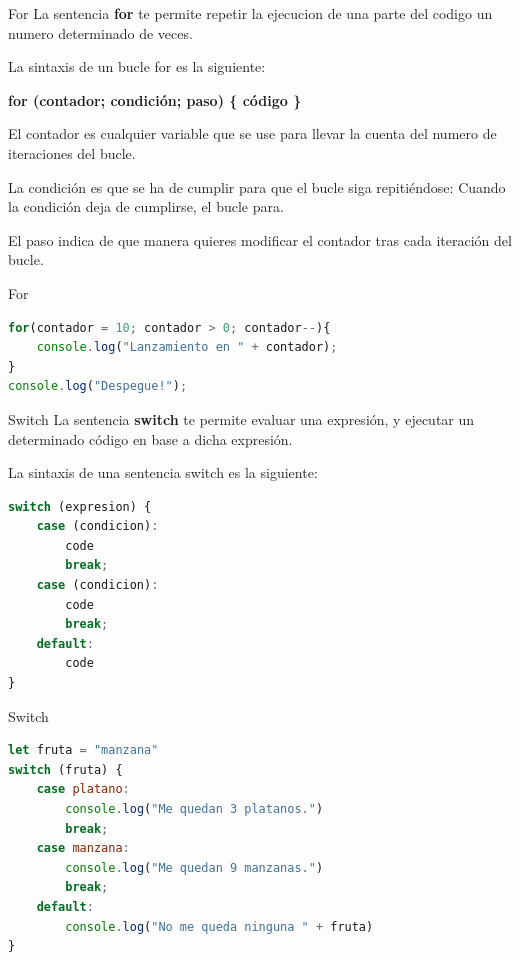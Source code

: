 \documentclass{beamer}
\begin{document}
\begin{frame}{For}
La sentencia \textbf{for} te permite repetir la ejecucion de una parte del codigo un numero determinado de veces.

La sintaxis de un bucle for es la siguiente:

\textbf{for (contador; condición; paso) \{ código \} }

El contador es cualquier variable que se use para llevar la cuenta del numero de iteraciones del bucle.

La condición es que se ha de cumplir para que el bucle siga repitiéndose: Cuando la condición deja de cumplirse, el bucle para.

El paso indica de que manera quieres modificar el contador tras cada iteración del bucle.
\end{frame}

\begin{frame}[fragile]{For}
\begin{lstlisting}[language=JavaScript]
for(contador = 10; contador > 0; contador--){
    console.log("Lanzamiento en " + contador);
}
console.log("Despegue!");
\end{lstlisting}
\end{frame}

\begin{frame}[fragile]{Switch}
La sentencia \textbf{switch} te permite evaluar una expresión, y ejecutar un determinado código en base a dicha expresión.

La sintaxis de una sentencia switch es la siguiente:

\begin{lstlisting}[language=JavaScript]
switch (expresion) {
    case (condicion): 
        code
        break;
    case (condicion):
        code
        break;
    default:
        code
}\end{lstlisting}
\end{frame}

\begin{frame}[fragile]{Switch}
\begin{lstlisting}[language=JavaScript]
let fruta = "manzana"
switch (fruta) {
    case platano: 
        console.log("Me quedan 3 platanos.")
        break;
    case manzana:
        console.log("Me quedan 9 manzanas.")
        break;
    default:
        console.log("No me queda ninguna " + fruta)
}\end{lstlisting}
\end{frame}
\end{document}
